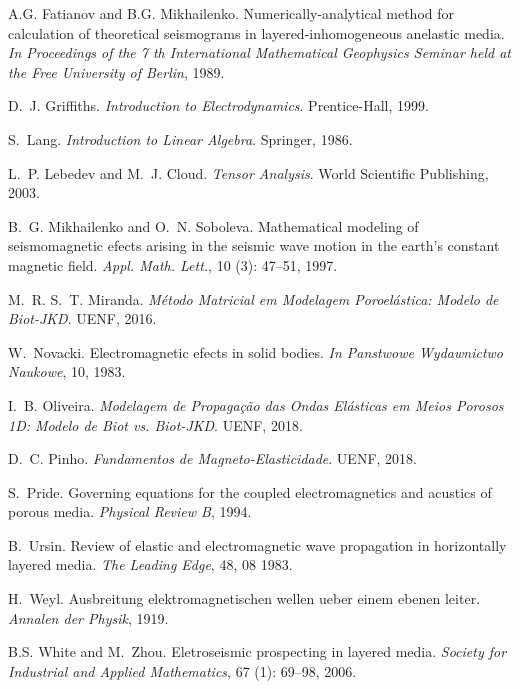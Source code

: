 \documentclass[12pt,a4paper,oneside]{abntex2}
\begin{document}
\begin{thebibliography}{25}
A.G. Fatianov and B.G. Mikhailenko.
\newblock Numerically-analytical method for calculation of theoretical
  seismograms in layered-inhomogeneous anelastic media.
\newblock \emph{In Proceedings of the 7 th International Mathematical
  Geophysics Seminar held at the Free University of Berlin}, 1989.

D.~J. Griffiths.
\newblock \emph{Introduction to Electrodynamics}.
\newblock Prentice-Hall, 1999.

S.~Lang.
\newblock \emph{Introduction to Linear Algebra}.
\newblock Springer, 1986.

L.~P. Lebedev and M.~J. Cloud.
\newblock \emph{Tensor Analysis}.
\newblock World Scientific Publishing, 2003.

B.~G. Mikhailenko and O.~N. Soboleva.
\newblock Mathematical modeling of seismomagnetic efects arising in the seismic
  wave motion in the earth's constant magnetic field.
\newblock \emph{Appl. Math. Lett.}, 10 (3): 47--51, 1997.

M.~R. S.~T. Miranda.
\newblock \emph{M\'etodo Matricial em Modelagem Poroel\'astica: Modelo de
  Biot-JKD}.
\newblock UENF, 2016.

W.~Novacki.
\newblock Electromagnetic efects in solid bodies.
\newblock \emph{In Panstwowe Wydawnictwo Naukowe}, 10, 1983.

I.~B. Oliveira.
\newblock \emph{Modelagem de Propaga\c{c}\~ao das Ondas El\'asticas em Meios
  Porosos 1D: Modelo de Biot vs. Biot-JKD}.
\newblock UENF, 2018.

D.~C. Pinho.
\newblock \emph{Fundamentos de Magneto-Elasticidade}.
\newblock UENF, 2018.

S.~Pride.
\newblock Governing equations for the coupled electromagnetics and acustics of
  porous media.
\newblock \emph{Physical Review B}, 1994.

B.~Ursin.
\newblock Review of elastic and electromagnetic wave propagation in
  horizontally layered media.
\newblock \emph{The Leading Edge}, 48, 08 1983.

H.~Weyl.
\newblock Ausbreitung elektromagnetischen wellen ueber einem ebenen leiter.
\newblock \emph{Annalen der Physik}, 1919.

B.S. White and M.~Zhou.
\newblock Eletroseismic prospecting in layered media.
\newblock \emph{Society for Industrial and Applied Mathematics}, 67
  (1): 69--98, 2006.

\end{thebibliography}
\end{document}
